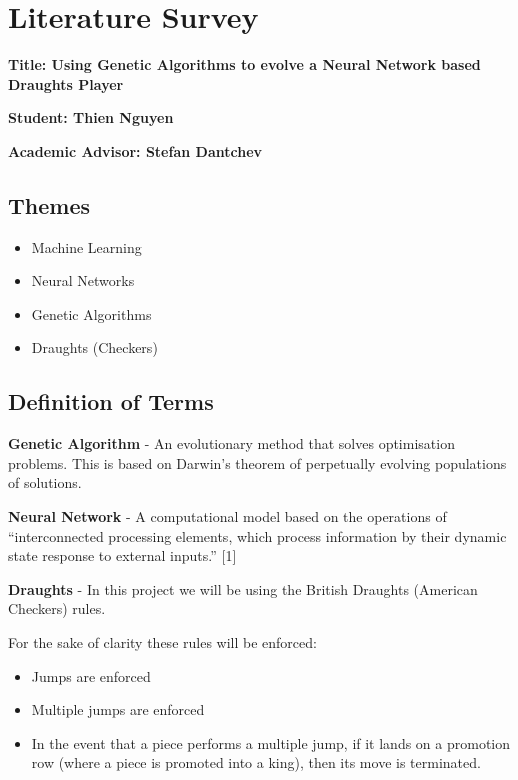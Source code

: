 \documentclass[]{article}
\date{}
\providecommand{\tightlist}{%
  \setlength{\itemsep}{0pt}\setlength{\parskip}{0pt}}
\begin{document}
\section{Literature Survey}\label{literature-survey}

\textbf{Title: Using Genetic Algorithms to evolve a Neural Network based
Draughts Player}

\textbf{Student: Thien Nguyen}

\textbf{Academic Advisor: Stefan Dantchev}

\subsection{Themes}\label{themes}

\begin{itemize}
\tightlist
\item
  Machine Learning
\item
  Neural Networks
\item
  Genetic Algorithms
\item
  Draughts (Checkers)
\end{itemize}

\subsection{Definition of Terms}\label{definition-of-terms}

\textbf{Genetic Algorithm} - An evolutionary method that solves
optimisation problems. This is based on Darwin's theorem of perpetually
evolving populations of solutions.

\textbf{Neural Network} - A computational model based on the operations
of ``interconnected processing elements, which process information by
their dynamic state response to external inputs.'' {[}1{]}

\textbf{Draughts} - In this project we will be using the British
Draughts (American Checkers) rules.

For the sake of clarity these rules will be enforced:

\begin{itemize}
\tightlist
\item
  Jumps are enforced
\item
  Multiple jumps are enforced
\item
  In the event that a piece performs a multiple jump, if it lands on a
  promotion row (where a piece is promoted into a king), then its move
  is terminated.
\end{itemize}
\end{document}
